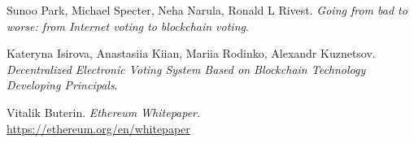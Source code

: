 \documentclass[10pt]{article}
\begin{document}
\begin{multicols}{2}
\begin{thebibliography}{100}
Sunoo Park, Michael Specter, Neha Narula, Ronald L Rivest. 
\textit{Going from bad to worse: from Internet voting to blockchain voting}.

Kateryna Isirova, Anastasiia Kiian, Mariia Rodinko, Alexandr Kuznetsov. 
\textit{Decentralized Electronic Voting System Based on Blockchain Technology Developing Principals}.

Vitalik Buterin. 
\textit{Ethereum Whitepaper}.
{\small \\\url{https://ethereum.org/en/whitepaper}}

\end{thebibliography}

\end{multicols}
\end{document}
